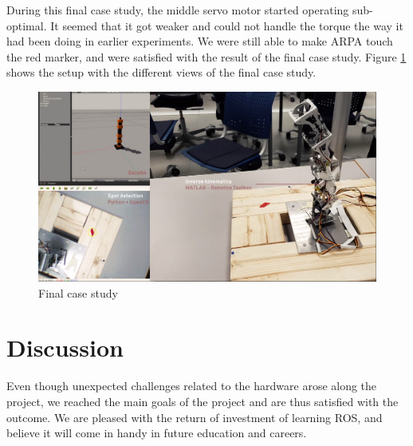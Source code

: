 \documentclass[11pt,a4paper, titlepage]{article}
\begin{document}
During this final case study, the middle servo motor started operating sub-optimal. It seemed that it got weaker and could not handle the torque the way it had been doing in earlier experiments. We were still able to make ARPA touch the red marker, and were satisfied with the result of the final case study. Figure \ref{fig:three-split} shows the setup with the different views of the final case study.
	\begin{figure}[H]
		\centering
		\includegraphics[width=\linewidth]{../Diagrams/ThreeSplit.png}
		\caption{Final case study}
		\label{fig:three-split}
	\end{figure}
	
	\section{Discussion}
	\label{discussion}
	Even though unexpected challenges related to the hardware arose along the project, we reached the main goals of the project and are thus satisfied with the outcome. We are pleased with the return of investment of learning ROS, and believe it will come in handy in future education and careers.
	
	
	
	\newpage
\end{document}
